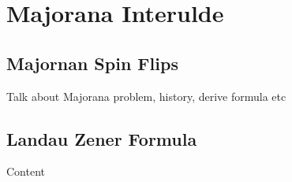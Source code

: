 
\chapter{Majorana Interulde} %

\label{ch:majinter} %


\section{Majornan Spin Flips}

Talk about Majorana problem, history, derive formula etc


\section{Landau Zener Formula}

Content